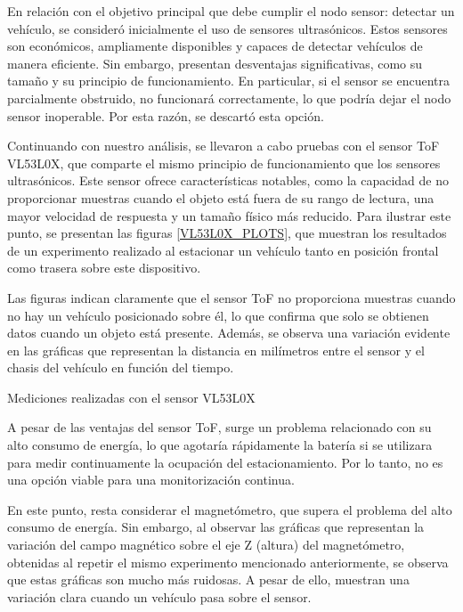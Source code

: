 En relación con el objetivo principal que debe cumplir el nodo sensor: detectar un vehículo, se consideró inicialmente el uso de sensores ultrasónicos. Estos sensores son económicos, ampliamente disponibles y capaces de detectar vehículos de manera eficiente. Sin embargo, presentan desventajas significativas, como su tamaño y su principio de funcionamiento. En particular, si el sensor se encuentra parcialmente obstruido, no funcionará correctamente, lo que podría dejar el nodo sensor inoperable. Por esta razón, se descartó esta opción.

Continuando con nuestro análisis, se llevaron a cabo pruebas con el sensor ToF VL53L0X, que comparte el mismo principio de funcionamiento que los sensores ultrasónicos. Este sensor ofrece características notables, como la capacidad de no proporcionar muestras cuando el objeto está fuera de su rango de lectura, una mayor velocidad de respuesta y un tamaño físico más reducido. Para ilustrar este punto, se presentan las figuras \ref{VL53L0X_PLOTS}, que muestran los resultados de un experimento realizado al estacionar un vehículo tanto en posición frontal como trasera sobre este dispositivo.

Las figuras indican claramente que el sensor ToF no proporciona muestras cuando no hay un vehículo posicionado sobre él, lo que confirma que solo se obtienen datos cuando un objeto está presente. Además, se observa una variación evidente en las gráficas que representan la distancia en milímetros entre el sensor y el chasis del vehículo en función del tiempo.

\begin{images}[\label{VL53L0X_PLOTS}]{Mediciones realizadas con el sensor VL53L0X}
\end{images}

A pesar de las ventajas del sensor ToF, surge un problema relacionado con su alto consumo de energía, lo que agotaría rápidamente la batería si se utilizara para medir continuamente la ocupación del estacionamiento. Por lo tanto, no es una opción viable para una monitorización continua.

En este punto, resta considerar el magnetómetro, que supera el problema del alto consumo de energía. Sin embargo, al observar las gráficas que representan la variación del campo magnético sobre el eje Z (altura) del magnetómetro, obtenidas al repetir el mismo experimento mencionado anteriormente, se observa que estas gráficas son mucho más ruidosas. A pesar de ello, muestran una variación clara cuando un vehículo pasa sobre el sensor.

